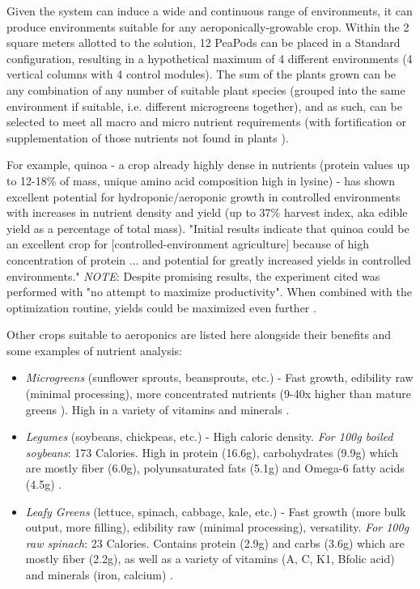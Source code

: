 \documentclass{../tex/report}
\begin{document}

Given the system can induce a wide and continuous range of environments, it can produce environments suitable for any aeroponically-growable crop. Within the 2 square meters allotted to the solution, 12 PeaPods can be placed in a Standard configuration, resulting in a hypothetical maximum of 4 different environments (4 vertical columns with 4 control modules). The sum of the plants grown can be any combination of any number of suitable plant species (grouped into the same environment if suitable, i.e. different microgreens together), and as such, can be selected to meet all macro and micro nutrient requirements (with fortification or supplementation of those nutrients not found in plants \cite{plantbased}). 

For example, quinoa - a crop already highly dense in nutrients (protein values up to 12-18\% of mass, unique amino acid composition high in lysine) - has shown excellent potential for hydroponic/aeroponic growth in controlled environments with increases in nutrient density and yield (up to 37\% harvest index, aka edible yield as a percentage of total mass). "Initial results indicate that quinoa could be an excellent crop for [controlled-environment agriculture] because of high concentration of protein ... and potential for greatly increased yields in controlled environments." \textit{NOTE}: Despite promising results, the experiment cited was performed with "no attempt to maximize productivity". When combined with the optimization routine, yields could be maximized even further \cite{quinoa}.

Other crops suitable to aeroponics are listed here alongside their benefits and some examples of nutrient analysis:
\begin{itemize}
    \item \textit{Microgreens} (sunflower sprouts, beansprouts, etc.) - Fast growth, edibility raw (minimal processing), more concentrated nutrients (9-40x higher than mature greens \cite{microgreens2}). High in a variety of vitamins and minerals \cite{microgreens1}.
    \item \textit{Legumes} (soybeans, chickpeas, etc.) - High caloric density. \textit{For 100g boiled soybeans}: 173 Calories. High in protein (16.6g), carbohydrates (9.9g) which are mostly fiber (6.0g), polyunsaturated fats (5.1g) and Omega-6 fatty acids (4.5g) \cite{soybeans}.
    \item \textit{Leafy Greens} (lettuce, spinach, cabbage, kale, etc.) - Fast growth (more bulk output, more filling), edibility raw (minimal processing), versatility. \textit{For 100g raw spinach}: 23 Calories. Contains protein (2.9g) and carbs (3.6g) which are mostly fiber (2.2g), as well as a variety of vitamins (A, C, K1, Bfolic acid) and minerals (iron, calcium) \cite{spinach}. 
\end{itemize}
\end{document}
